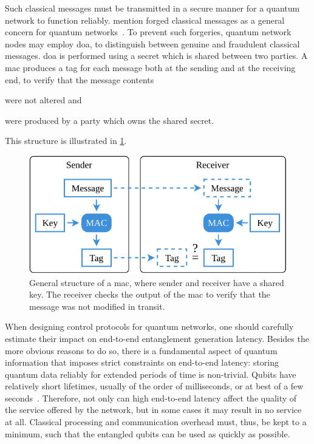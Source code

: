 Such classical messages must be transmitted in a secure manner for a quantum network to function
reliably. \citeauthor{satoh_2020_attacking} mention forged classical messages as a general concern
for quantum networks~\cite{satoh_2020_attacking}. To prevent such forgeries, quantum network nodes
may employ \acrfull{doa}, to distinguish between genuine and fraudulent classical messages.
\acrshort{doa} is performed using a secret which is shared between two parties. A \acrfull{mac}
produces a tag for each message both at the sending and at the receiving end, to verify that the
message contents
%
\begin{inlinelist}
    \item were not altered and
    \item were produced by a party which owns the shared secret.
\end{inlinelist}
%
This structure is illustrated in \cref{fig:mac-structure}.

\begin{figure}[t]
    \centering
    \includegraphics[width=0.6\linewidth]{figures/mac-structure.pdf}
    \caption{
        General structure of a \acrfull{mac}, where sender and receiver have a shared key. The
        receiver checks the output of the \acrshort{mac} to verify that the message was not modified
        in transit.
    }
    \label{fig:mac-structure}
\end{figure}

When designing control protocols for quantum networks, one should carefully estimate their impact on
end-to-end entanglement generation latency. Besides the more obvious reasons to do so, there is a
fundamental aspect of quantum information that imposes strict constraints on end-to-end latency:
storing quantum data reliably for extended periods of time is non-trivial. Qubits have relatively
short lifetimes, usually of the order of milliseconds, or at best of a few
seconds~\cite{abobeih_2018_one_sec, bradley_2019_one_min}. Therefore, not only can high end-to-end
latency affect the quality of the service offered by the network, but in some cases it may result in
no service at all. Classical processing and communication overhead must, thus, be kept to a minimum,
such that the entangled qubits can be used as quickly as possible.

